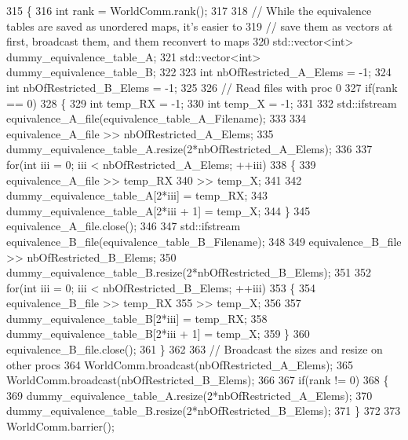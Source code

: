 \begin{DoxyCode}
315 \{
316     \textcolor{keywordtype}{int} rank = WorldComm.rank();
317 
318     \textcolor{comment}{//  While the equivalence tables are saved as unordered maps, it's easier to}
319     \textcolor{comment}{// save them as vectors at first, broadcast them, and them reconvert to maps}
320     std::vector<int> dummy\_equivalence\_table\_A;
321     std::vector<int> dummy\_equivalence\_table\_B;
322 
323     \textcolor{keywordtype}{int} nbOfRestricted\_A\_Elems = -1;
324     \textcolor{keywordtype}{int} nbOfRestricted\_B\_Elems = -1;
325 
326     \textcolor{comment}{// Read files with proc 0}
327     \textcolor{keywordflow}{if}(rank == 0)
328     \{
329         \textcolor{keywordtype}{int} temp\_RX = -1;
330         \textcolor{keywordtype}{int} temp\_X = -1;
331 
332         std::ifstream equivalence\_A\_file(equivalence\_table\_A\_Filename);
333 
334         equivalence\_A\_file >> nbOfRestricted\_A\_Elems;
335         dummy\_equivalence\_table\_A.resize(2*nbOfRestricted\_A\_Elems);
336 
337         \textcolor{keywordflow}{for}(\textcolor{keywordtype}{int} iii = 0; iii < nbOfRestricted\_A\_Elems; ++iii)
338         \{
339             equivalence\_A\_file  >> temp\_RX
340                                 >> temp\_X;
341 
342             dummy\_equivalence\_table\_A[2*iii] = temp\_RX;
343             dummy\_equivalence\_table\_A[2*iii + 1] = temp\_X;
344         \}
345         equivalence\_A\_file.close();
346 
347         std::ifstream equivalence\_B\_file(equivalence\_table\_B\_Filename);
348 
349         equivalence\_B\_file >> nbOfRestricted\_B\_Elems;
350         dummy\_equivalence\_table\_B.resize(2*nbOfRestricted\_B\_Elems);
351 
352         \textcolor{keywordflow}{for}(\textcolor{keywordtype}{int} iii = 0; iii < nbOfRestricted\_B\_Elems; ++iii)
353         \{
354             equivalence\_B\_file  >> temp\_RX
355                                 >> temp\_X;
356 
357             dummy\_equivalence\_table\_B[2*iii] = temp\_RX;
358             dummy\_equivalence\_table\_B[2*iii + 1] = temp\_X;
359         \}
360         equivalence\_B\_file.close();
361     \}
362 
363     \textcolor{comment}{// Broadcast the sizes and resize on other procs}
364     WorldComm.broadcast(nbOfRestricted\_A\_Elems);
365     WorldComm.broadcast(nbOfRestricted\_B\_Elems);
366 
367     \textcolor{keywordflow}{if}(rank != 0)
368     \{
369         dummy\_equivalence\_table\_A.resize(2*nbOfRestricted\_A\_Elems);
370         dummy\_equivalence\_table\_B.resize(2*nbOfRestricted\_B\_Elems);
371     \}
372 
373     WorldComm.barrier();

\end{DoxyCode}
